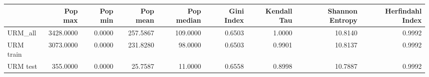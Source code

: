 \begin{tabular}{lrrrrrrrr}
\toprule
{} &   Pop max &  Pop min &  Pop mean &  Pop median &  Gini Index &  Kendall Tau &  Shannon Entropy &  Herfindahl Index \\
\midrule
URM\_all   & 3428.0000 &   0.0000 &  257.5867 &    109.0000 &      0.6503 &       1.0000 &          10.8140 &            0.9992 \\
URM train & 3073.0000 &   0.0000 &  231.8280 &     98.0000 &      0.6503 &       0.9901 &          10.8137 &            0.9992 \\
URM test  &  355.0000 &   0.0000 &   25.7587 &     11.0000 &      0.6558 &       0.8998 &          10.7887 &            0.9992 \\
\bottomrule
\end{tabular}
